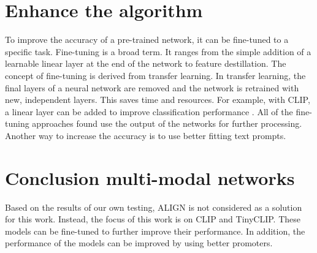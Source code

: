 
\section{Enhance the algorithm}

    To improve the accuracy of a pre-trained network, it can be fine-tuned to a specific task.
    Fine-tuning is a broad term.
    It ranges from the simple addition of a learnable linear layer at the end of the network to feature destillation.
    The concept of fine-tuning is derived from transfer learning\cite{transferlearning}.
    In transfer learning, the final layers of a neural network are removed and the network is retrained with new, independent layers.
    This saves time and resources.
    For example, with CLIP, a linear layer can be added to improve classification performance \cite{finetuneclip}.
    All of the fine-tuning approaches found use the output of the networks for further processing.
    Another way to increase the accuracy is to use better fitting text prompts.


\section{Conclusion multi-modal networks}
    Based on the results of our own testing, ALIGN is not considered as a solution for this work.
    Instead, the focus of this work is on CLIP and TinyCLIP.
    These models can be fine-tuned to further improve their performance.
    In addition, the performance of the models can be improved by using better promoters.